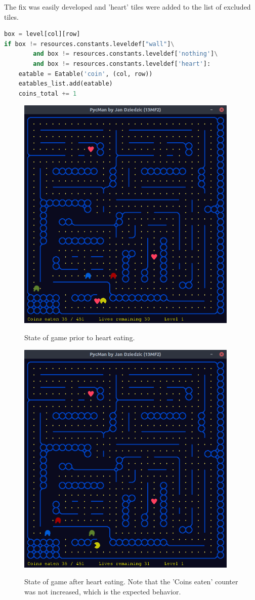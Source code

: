 \documentclass[11pt,a4paper,notitlepage]{report}
\newenvironment{img}{
	\begin{center}
		\begin{figure}[H]
			\begin{center}
			
}{
	\end{center}
		\end{figure}
			\end{center}
}
\begin{document}
				The fix was easily developed and 'heart' tiles were added to the list of excluded tiles.
				\begin{lstlisting}[language=Python]
box = level[col][row]
if box != resources.constants.leveldef["wall"]\
		and box != resources.constants.leveldef['nothing']\
		and box != resources.constants.leveldef['heart']:
	eatable = Eatable('coin', (col, row))
	eatables_list.add(eatable)
	coins_total += 1
				\end{lstlisting}
				\begin{img}
					\includegraphics[width=300pt]{images/hearts-working2.png}\\
					\caption{State of game prior to heart eating.}
				\end{img}
				\begin{img}
					\includegraphics[width=300pt]{images/hearts-working3.png}\\
					\caption{State of game after heart eating. Note that the 'Coins eaten' counter was not increased, which is the expected behavior.}
				\end{img}
\end{document}
